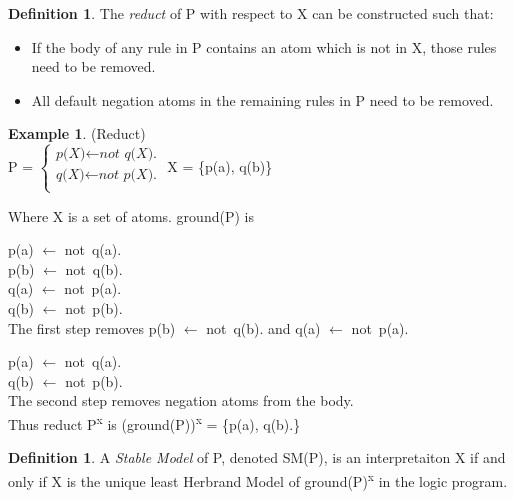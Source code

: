 \documentclass[11pt,twoside]{report}
\theoremstyle{plain}
\theoremstyle{definition}
\newtheorem{defn}[thm]{Definition} %
\newtheorem{examp}{Example}[section]
\begin{document}
\begin{defn}
The \textit{reduct} of P with respect to X can be constructed such that:
\begin{itemize}
\item If the body of any rule in P contains an atom which is not in X, those rules need to be removed.
\item All default negation atoms in the remaining rules in P need to be removed.
\end{itemize}
\end{defn}

\begin{examp} \normalfont (Reduct) \\

P = $\begin{cases}
	\textit{p(X)}  \leftarrow \textit{not q(X).} \\
  	\textit{q(X)} \leftarrow \textit{not p(X).} \\
      \end{cases}$  X = \{p(a), q(b)\}

Where X is a set of atoms. ground(P) is

p(a)  $\leftarrow$ not\ q(a). \\
p(b)  $\leftarrow$ not\ q(b). \\
q(a) $\leftarrow$ not\ p(a). \\
q(b) $\leftarrow$ not\ p(b). \\

 The first step removes p(b)  $\leftarrow$ not\ q(b). and q(a) $\leftarrow$ not\ p(a).

p(a)  $\leftarrow$ not\ q(a). \\
q(b) $\leftarrow$ not\ p(b). \\

The second step removes negation atoms from the body. \\
Thus reduct P\textsuperscript{x} is (ground(P))\textsuperscript{x} =  \{p(a), q(b).\}
\end{examp}
\label{reduct}

\begin{defn}
A \textit{Stable Model} of P, denoted SM(P), is an interpretaiton X if and only if X is the unique least Herbrand Model of ground(P)\textsuperscript{x} in the logic program.
\end{defn}
\end{document}
